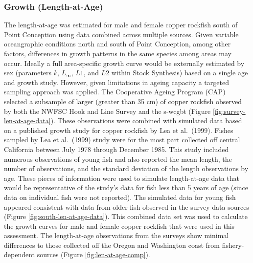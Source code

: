 \documentclass[11pt,
  english,
  a4paper,
]{article}
\begin{document}
\leavevmode\tagmcend\tagstructend\par


\hypertarget{growth-length-at-age}{%
\subsubsection{Growth (Length-at-Age)}\label{growth-length-at-age}}

\leavevmode\tagmcend\tagstructend


The length-at-age was estimated for male and female copper rockfish south of Point Conception using data combined across multiple sources. Given variable oceangraphic conditions north and south of Point Conception, among other factors, differences in growth patterns in the same species among areas may occur. Ideally a full area-specific growth curve would be externally estimated by sex (parameters {\(k\)\leavevmode\tagmcend\tagstructend}, {\(L_{\infty}\)\leavevmode\tagmcend\tagstructend}, {\(L1\)\leavevmode\tagmcend\tagstructend}, and {\(L2\)\leavevmode\tagmcend\tagstructend} within Stock Synthesis) based on a single age and growth study. However, given limitations in ageing capacity a targeted sampling approach was applied. The Cooperative Ageing Program (CAP) selected a subsample of larger (greater than 35 cm) of copper rockfish observed by both the NWFSC Hook and Line Survey and the \Gls{s-wcgbt} (Figure \ref{fig:survey-len-at-age-data}). These observations were combined with simulated data based on a published growth study for copper rockfish by Lea et al.~{(1999)\leavevmode\tagmcend\tagstructend}. Fishes sampled by Lea et al.~{(1999)\leavevmode\tagmcend\tagstructend} study were for the most part collected off central California between July 1978 through December 1985. This study included numerous observations of young fish and also reported the mean length, the number of observations, and the standard deviation of the length observations by age. These pieces of information were used to simulate length-at-age data that would be representative of the study's data for fish less than 5 years of age (since data on individual fish were not reported). The simulated data for young fish appeared consistent with data from older fish observed in the survey data sources (Figure \ref{fig:south-len-at-age-data}). This combined data set was used to calculate the growth curves for male and female copper rockfish that were used in this assessment. The length-at-age observations from the surveys show minimal differences to those collected off the Oregon and Washington coast from fishery-dependent sources (Figure \ref{fig:len-at-age-comp}).
\end{document}
